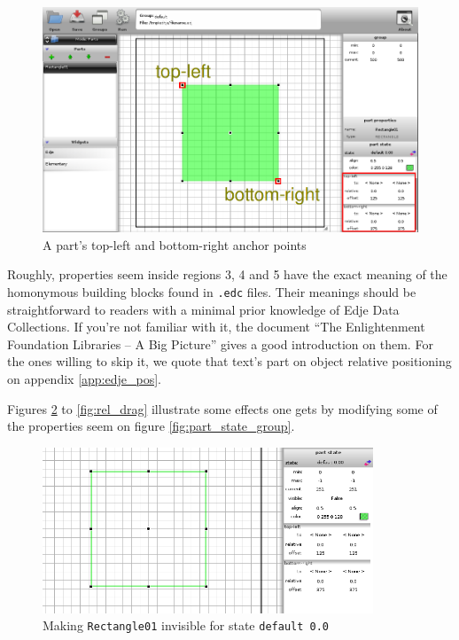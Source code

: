 \documentclass[a4paper]{profusion}
\begin{document}
\begin{figure}[h!]
  \centering
  \includegraphics[width=1.0\textwidth]{images/rectangle_rel1rel2.png}
  \caption{A part's top-left and bottom-right anchor points}
  \label{fig:rectangle_rel1rel2}
\end{figure}

Roughly, properties seem inside regions 3, 4 and 5 have the exact
meaning of the homonymous building blocks found in \texttt{.edc}
files.  Their meanings should be straightforward to readers with a
minimal prior knowledge of Edje Data Collections. If you're not
familiar with it, the document ``The Enlightenment Foundation
Libraries -- A Big Picture'' gives a good introduction on them. For
the ones willing to skip it, we quote that text's part on object
relative positioning on appendix \ref{app:edje_pos}.

Figures \ref{fig:visibility_false} to \ref{fig:rel_drag} illustrate
some effects one gets by modifying some of the properties seem on
figure \ref{fig:part_state_group}.

\begin{figure}[h!]
  \centering
  \includegraphics[width=0.88\textwidth]{images/visibility_false.png}
  \caption{Making \texttt{Rectangle01} invisible for state
    \texttt{default 0.0}}
  \label{fig:visibility_false}
\end{figure}
\end{document}

